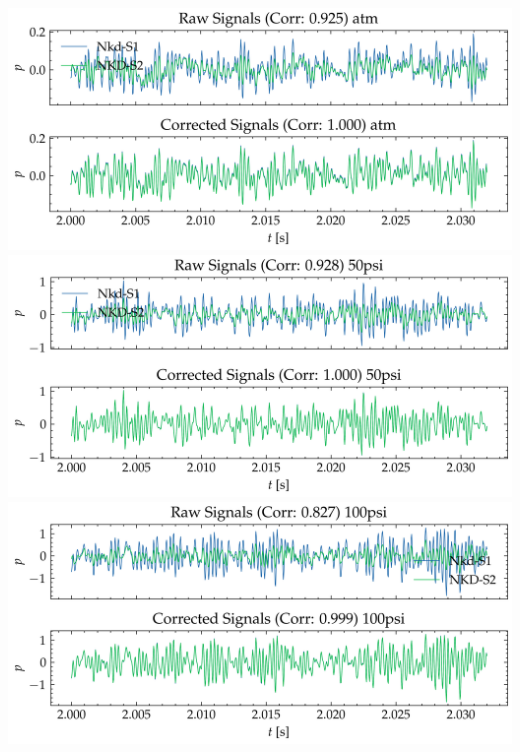 \documentclass[aspectratio=169,10pt]{beamer}
\begin{document}
\begin{frame}
\begin{columns}[c]
\begin{tikzpicture}[scale=0.7, transform shape,
                node distance=6mm and 18mm, every node/.style={font=\small}]
            \end{tikzpicture}
            \includegraphics[width=0.8\linewidth]{S1-S2/y_atm.png}
            \includegraphics[width=0.8\linewidth]{S1-S2/y_50psi.png}
            \includegraphics[width=0.8\linewidth]{S1-S2/y_100psi.png}
    \end{columns}
\end{frame}
\end{document}
